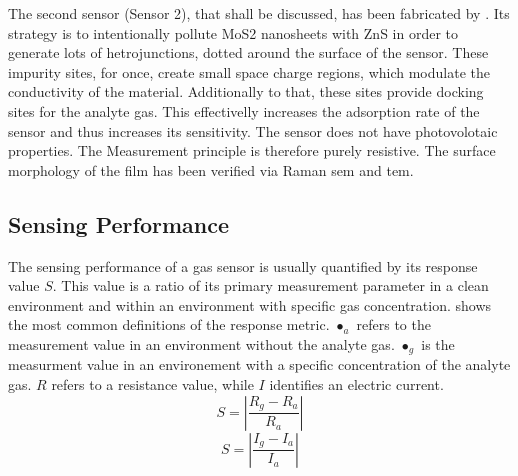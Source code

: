 The second sensor (Sensor 2), that shall be discussed, has been fabricated by \cite{Liu2021}. Its strategy is to intentionally pollute MoS2 nanosheets with ZnS in order to generate lots of hetrojunctions, dotted around the surface of the sensor. These impurity sites, for once, create small space charge regions, which modulate the conductivity of the material. Additionally to that, these sites provide docking sites for the analyte gas. This effectivelly increases the adsorption rate of the sensor and thus increases its sensitivity. The sensor does not have photovolotaic properties. The Measurement principle is therefore purely resistive. The surface morphology of the film has been verified via Raman \gls{sem} and \gls{tem}.\\
\subsection{Sensing Performance}
The sensing performance of a gas sensor is usually quantified by its response value $S$. This value is a ratio of its primary measurement parameter in a clean environment and within an environment with specific gas concentration.  shows the most common definitions of the response metric. $\bullet_a$ refers to the measurement value in an environment without the analyte gas. $\bullet_g$ is the measurment value in an environement with a specific concentration of the analyte gas. $R$ refers to a resistance value, while $I$ identifies an electric current.
\begin{equation}
\label{eqn:respone_1}
    S = |\frac{R_g-R_a}{R_a}|
\end{equation}
\begin{equation}
\label{eqn:respone_2}
    S = |\frac{I_g-I_a}{I_a}|
\end{equation}

